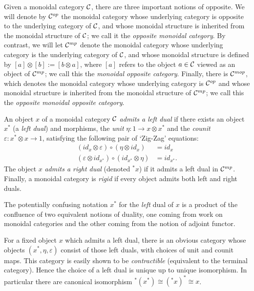 \documentclass{amsart}
\begin{document}
Given a monoidal category $\mathcal C$, there are three important notions of opposite. We will denote by $\mathcal C^{{op}}$ the monoidal category whose underlying category is opposite to the underlying  category of $\mathcal C$, and whose monoidal structure is inherited from the monoidal structure of $\mathcal C$; we call it the {\em opposite monoidal category}.  By contrast, we will let $\mathcal C^{{mp}}$ denote the monoidal category whose underlying category is the underlying category of $\mathcal C$, and whose monoidal structure is defined by $[a] \otimes [b] := [b \otimes a]$, where $[a]$ refers to the object $a \in \mathcal C$ viewed as an object of $\mathcal C^{{mp}}$; we call this the {\em monoidal opposite category}.  Finally, there is $\mathcal C^{{mop}}$, which denotes the monoidal category whose underlying  category is $\mathcal C^{{op}}$ and whose monoidal structure is inherited from the monoidal structure of $\mathcal C^{{mp}}$; we call this the {\em opposite monoidal opposite category}.

\begin{definition}
	An object $x$ of a monoidal category $\mathcal C$ {\em admits a left dual} if there exists an object $x^*$ (a {\em left dual}) and morphisms, the {\em unit} $\eta: 1 \to x \otimes x^*$ and the {\em counit} $\varepsilon: x^* \otimes x \to 1$, satisfying the following pair of `Zig-Zag' equations:
	\begin{align*}
		(id_{x} \otimes \varepsilon  ) \circ (  \eta \otimes id_{x}) &= id_{x} \\
		(\varepsilon \otimes id_{x^*}) \circ (id_{x^*} \otimes \eta) &= id_{x^*}.
	\end{align*}
The object $x$ {\em admits a right dual} (denoted ${}^*x$) if it admits a left dual in $\mathcal C^{mp}$. Finally, a monoidal category is {\em rigid} if every object admits both left and right duals. 
\end{definition}

\begin{remark}
	The potentially confusing notation $x^*$ for the {\em left} dual of $x$ is a product of the confluence of two equivalent notions of duality, one coming from work on monoidal categories and the other coming from the notion of adjoint functor.  
\end{remark}

\begin{remark}
	For a fixed object $x$ which admits a left dual, there is an obvious category whose objects $(x^*, \eta, \varepsilon)$ consist of those left duals, with choices of unit and counit maps. This category is easily shown to be {\em contractible} (equivalent to the terminal category). Hence the choice of a left dual is unique up to unique isomorphism. In particular there are canonical isomorphism ${}^*(x^*) \cong ({}^*x)^* \cong x$. 
\end{remark}
\end{document}
